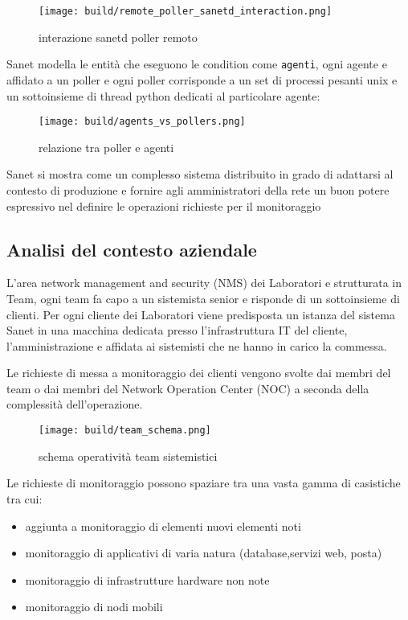 \begin{figure}[H]
    \centering
    \texttt{[image: build/remote\_poller\_sanetd\_interaction.png]}
    \caption{interazione sanetd poller remoto}
    \label{fig:enter-label}
\end{figure}

Sanet modella le entità che eseguono le condition come \verb|agenti|, ogni agente e affidato a un poller e ogni poller corrisponde a un set di processi pesanti unix e un sottoinsieme di thread python dedicati al particolare agente:


\begin{figure}[H]
    \centering
    \texttt{[image: build/agents\_vs\_pollers.png]}
    \caption{relazione tra poller e agenti}
    \label{fig:enter-label}
\end{figure}

Sanet si mostra come un complesso sistema distribuito in grado di adattarsi al contesto di produzione e fornire agli amministratori della rete un buon potere espressivo nel definire le operazioni richieste per il monitoraggio

\subsection{Analisi del contesto aziendale}

L'area network management and security (NMS) dei Laboratori e strutturata in Team, ogni team fa capo a un sistemista senior e risponde di un sottoinsieme di clienti. Per ogni cliente dei Laboratori viene predisposta un istanza del sistema Sanet in una macchina dedicata presso l'infrastruttura IT del cliente, l'amministrazione e affidata ai sistemisti che ne hanno in carico la commessa.

Le richieste di messa a monitoraggio dei clienti vengono svolte dai membri del team o dai membri del Network Operation Center (NOC) a seconda della complessità dell'operazione.

\begin{figure}[H]
    \centering
    \texttt{[image: build/team\_schema.png]}
    \caption{schema operatività team sistemistici}
    \label{fig:enter-label}
\end{figure}

Le richieste di monitoraggio possono spaziare tra una vasta gamma di casistiche tra cui:

\begin{itemize}
  \item{aggiunta a monitoraggio di elementi nuovi elementi noti}
  \item{monitoraggio di applicativi di varia natura (database,servizi web, posta)}
  \item{monitoraggio di infrastrutture hardware non note}
  \item{monitoraggio di nodi mobili}
\end{itemize}

